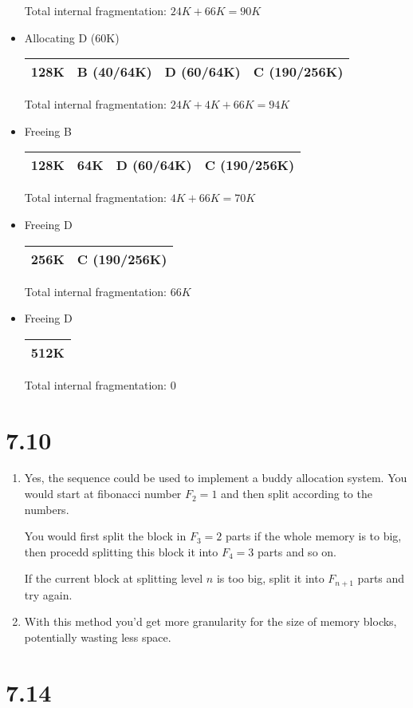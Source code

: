 \documentclass[12pt]{article}
\begin{document}
\begin{itemize}
		Total internal fragmentation: $24K + 66K = 90K$

		\item Allocating D (60K)

		\begin{tabular}{|p{}|p{}|p{}|p{}|}
			\hline
			128K & B (40/64K) & D (60/64K) & C (190/256K)\\
			\hline
		\end{tabular}

		Total internal fragmentation: $24K + 4K + 66K = 94K$

		\item Freeing B

		\begin{tabular}{|p{}|p{}|p{}|p{}|}
			\hline
			128K & 64K & D (60/64K) & C (190/256K)\\
			\hline
		\end{tabular}

		Total internal fragmentation: $4K + 66K = 70K$

		\item Freeing D

		\begin{tabular}{|p{}|p{}|}
			\hline
			256K & C (190/256K)\\
			\hline
		\end{tabular}

		Total internal fragmentation: $66K$

		\item Freeing D

		\begin{tabular}{|p{\linewidth}|}
			\hline
			512K\\
			\hline
		\end{tabular}

		Total internal fragmentation: $0$

	\end{itemize}

\section*{7.10}
\begin{enumerate}[a]
	\item %
	Yes, the sequence could be used to implement a buddy allocation system. You would start at fibonacci number $F_2 = 1$ and then split according to the numbers.

	You would first split the block in $F_3 = 2$ parts if the whole memory is to big, then procedd splitting this block it into $F_4 = 3$ parts and so on.

	If the current block at splitting level $n$ is too big, split it into $F_{n + 1}$ parts and try again.

	\item %
	With this method you'd get more granularity for the size of memory blocks, potentially wasting less space.
\end{enumerate}

\section*{7.14}
\end{document}
